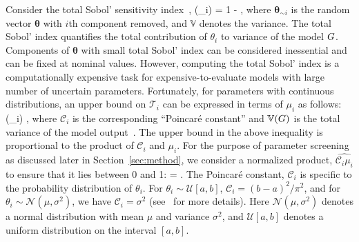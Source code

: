 Consider the total 
Sobol' sensitivity index~\cite{Sobol:2001},
\be
{}(\theta_i) = 1 - 
,
\label{eq:total}
\ee
where $\bm{\theta}_{\sim i}$ is the random vector $\bm\theta$ with $i$th component removed, 
and $\mathbb{V}$ denotes the variance. The total Sobol' index quantifies the total contribution 
of $\theta_i$ to variance of the model $G$. Components of $\bm\theta$ with small 
total Sobol' index can be considered inessential and can be fixed at nominal values. However, 
computing the total Sobol' index is a computationally expensive task for expensive-to-evaluate 
models with large number of uncertain parameters. Fortunately, 
for parameters with continuous distributions, an upper bound on $\mathcal{T}_i$  
can be expressed in terms of $\mu_i$ as follows: 
\be
{}(\theta_i) \leq {},
\label{eq:bound}
\ee
where $\mathcal{C}_i$ is the corresponding ``Poincar\'e constant''
and
$\mathbb{V}(G)$ is the total variance of the model
output~\cite{Lamboni:2013}.  The upper bound in the above inequality is
proportional to the product of $\mathcal{C}_i$ and $\mu_i$.  For the purpose of
parameter screening as discussed later in Section~\ref{sec:method}, we consider
a normalized product, $\widehat{\mathcal{C}_i\mu_i}$ to ensure that it lies
between 0 and 1:
\be
{} = .
\label{eq:cmu}
\ee
The Poincar\'e constant, $\mathcal{C}_i$ is specific to the probability
distribution of $\theta_i$. For $\theta_i \sim \mathcal{U}[a, b]$,
$\mathcal{C}_i = (b-a)^{2}/\pi^2$, and for  
$\theta_i \sim \mathcal{N}(\mu,\sigma^2)$, we have $\mathcal{C}_i = \sigma^2$
(see~\cite{Lamboni:2013} for more details). 
Here $\mathcal{N}(\mu,\sigma^2)$ denotes a normal distribution with mean $\mu$
and variance $\sigma^2$, and $\mathcal{U}[a,b]$ denotes a uniform distribution
on the interval $[a, b]$.

%

